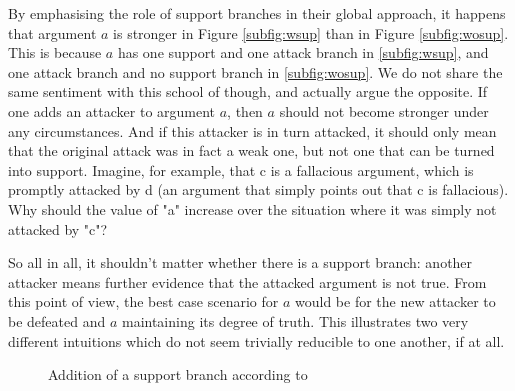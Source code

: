 \documentclass{article}
\begin{document}
By emphasising the role of support branches in their global approach, it happens that argument $a$ is stronger in Figure \ref{subfig:wsup} than in Figure \ref{subfig:wosup}. This is because $a$ has one support and one attack branch in \ref{subfig:wsup}, and one attack branch and no support branch in \ref{subfig:wosup}. We do not share the same sentiment with this school of though, and actually argue the opposite. If one adds an attacker to argument $a$, then $a$ should not become stronger under any circumstances. And if this attacker is in turn attacked, it should only mean that the original attack was in fact a weak one, but not one that can be turned into support. Imagine, for example, that c is a fallacious argument, which is promptly attacked by d (an argument that simply points out that c is fallacious). Why should the value of "a" increase over the situation where it was simply not attacked by "c"?

So all in all, it shouldn't matter whether there is a support branch: another attacker means further evidence that the attacked argument is not true. From this point of view, the best case scenario for $a$ would be for the new attacker to be defeated and $a$ maintaining its degree of truth. This illustrates two very different intuitions which do not seem trivially reducible to one another, if at all.

\begin{figure}[h!]
  \centering
   \hspace{1cm}
  
  \caption{Addition of  a support branch according to \cite{gradinarg}}
  \label{fig:oops}
\end{figure}
\end{document}
